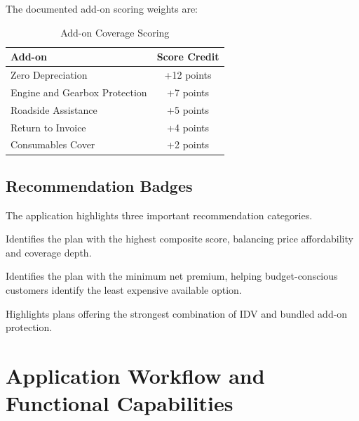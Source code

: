 \documentclass[11pt,a4paper]{article}
\begin{document}
The documented add-on scoring weights are:

\begin{table}[H]
\centering
\caption{Add-on Coverage Scoring}
\begin{tabular}{@{}lc@{}}
\toprule
\textbf{Add-on} & \textbf{Score Credit} \\
\midrule
Zero Depreciation & +12 points \\
Engine and Gearbox Protection & +7 points \\
Roadside Assistance & +5 points \\
Return to Invoice & +4 points \\
Consumables Cover & +2 points \\
\bottomrule
\end{tabular}
\end{table}

\subsection{Recommendation Badges}

The application highlights three important recommendation
categories.

\begin{successbox}[title={Best Value}]
Identifies the plan with the highest composite score,
balancing price affordability and coverage depth.
\end{successbox}

\begin{infobox}[title={Lowest Price}]
Identifies the plan with the minimum net premium,
helping budget-conscious customers identify the
least expensive available option.
\end{infobox}

\begin{tcolorbox}[
    colback=Orange!5,
    colframe=Orange,
    boxrule=0.7pt,
    arc=2mm,
    title=\textbf{Maximum Coverage}
]
Highlights plans offering the strongest combination of
IDV and bundled add-on protection.
\end{tcolorbox}


\section{Application Workflow and Functional Capabilities}
\end{document}

